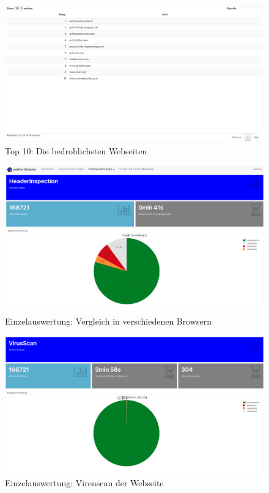 \begin{landscape}
\begin{figure}[H]
  \centering
  \includegraphics[width=\textheight]{images/stats/top10}
  \caption{Top 10: Die bedrohlichsten Webseiten}
  \label{fig:top10}
\end{figure}

\begin{figure}[H]
  \centering
  \includegraphics[width=\textheight]{images/stats/headerinspection}
  \caption{Einzelauswertung: Vergleich in verschiedenen Browsern}
  \label{fig:headerinspection}
\end{figure}

\begin{figure}[H]
  \centering
  \includegraphics[width=\textheight]{images/stats/virusscan}
  \caption{Einzelauswertung: Virenscan der Webseite}
  \label{fig:virusscan}
\end{figure}


\end{landscape}
